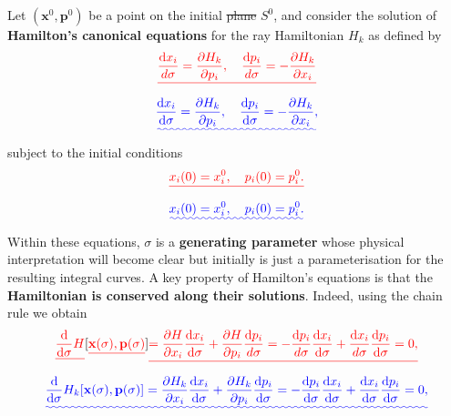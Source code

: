 \documentclass [a4paper,12pt]{paper}
\providecommand{\DIFadd}[1]{{\protect\color{blue}\uwave{#1}}} %
\providecommand{\DIFdel}[1]{{\protect\color{red}\sout{#1}}}                      %
\providecommand{\DIFaddbegin}{} %
\providecommand{\DIFaddend}{} %
\providecommand{\DIFdelbegin}{} %
\providecommand{\DIFdelend}{} %
\begin{document}
Let $(\mathbf{x}^{0},\mathbf{p}^{0})$ be a point on the initial \DIFdelbegin \DIFdel{plane }\DIFdelend \DIFaddbegin \DIFadd{surface }\DIFaddend $S^{0}$, and consider the solution of 
\textbf{Hamilton's canonical equations} for the ray Hamiltonian $H_{k}$ as defined by
\DIFdelbegin \begin{displaymath}
\DIFdel{\frac{\ddns x_{i}}{d\sigma}=\frac{\partial H_{k}}{\partial p_{i}}, \quad \frac{\ddns p_{i}}{d\sigma}=-\frac{\partial H_{k}}{\partial x_{i}}
}\end{displaymath}%
\DIFdelend \DIFaddbegin \begin{equation}
\DIFadd{\frac{\ddns x_{i}}{\ddns\sigma}=\frac{\partial H_{k}}{\partial p_{i}}, \quad \frac{\ddns p_{i}}{\ddns\sigma}=-\frac{\partial H_{k}}{\partial x_{i}},
\label{eq:30}
}\end{equation}\DIFaddend 
subject to the initial conditions
\DIFdelbegin \begin{displaymath}
\DIFdel{x_{i}(0)=x_{i}^{0}, \quad p_{i}(0)=p_{i}^{0}.
}\end{displaymath}%
\DIFdelend \DIFaddbegin \begin{equation}
\DIFadd{x_{i}(0)=x_{i}^{0}, \quad p_{i}(0)=p_{i}^{0}.
\label{eq:31}
}\end{equation}\DIFaddend 
Within these equations, $\sigma$ is a \textbf{generating parameter} whose physical interpretation will become clear but 
initially is just a parameterisation for the resulting integral curves.
A key property of Hamilton's equations is that the \textbf{Hamiltonian is conserved along their solutions}. Indeed, using the chain rule we obtain
\DIFdelbegin \begin{displaymath}
\DIFdel{\frac{\ddns}{\ddns\sigma}H}[\DIFdel{\mathbf{x}(\sigma), \mathbf{p}(\sigma)}]\DIFdel{=\frac{\partial H}{\partial x_{i}}\frac{\ddns x_{i}}{\ddns\sigma}+\frac{\partial H}{\partial p_{i}}\frac{\ddns p_{i}}{d\sigma} = -\frac{\ddns p_{i}}{d\sigma}\frac{\ddns x_{i}}{\ddns\sigma}+\frac{\ddns x_{i}}{d\sigma}\frac{\ddns p_{i}}{\ddns\sigma}=0,
}\end{displaymath}%
\DIFdelend \DIFaddbegin \begin{equation}
\DIFadd{\frac{\ddns}{\ddns\sigma}H_{k}[\mathbf{x}(\sigma), \mathbf{p}(\sigma)]=\frac{\partial H_{k}}{\partial x_{i}}\frac{\ddns x_{i}}{\ddns\sigma}+\frac{\partial H_{k}}{\partial p_{i}}\frac{\ddns p_{i}}{\ddns\sigma} = -\frac{\ddns p_{i}}{\ddns\sigma}\frac{\ddns x_{i}}{\ddns\sigma}+\frac{\ddns x_{i}}{\ddns\sigma}\frac{\ddns p_{i}}{\ddns\sigma}=0,
\label{eq:32}
}\end{equation}\DIFaddend 
\end{document}

